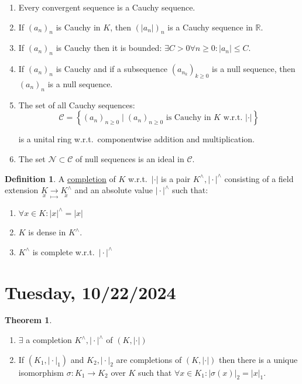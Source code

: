 \documentclass[openany]{amsbook}
\numberwithin{section}{chapter}
\theoremstyle{definition}
\newtheorem*{definition}{Definition}
\newtheorem{theorem}{Theorem}[chapter]
\begin{document}
\begin{enumerate}[label=\roman*)]
    \item Every convergent sequence is a Cauchy sequence.
    \item If \((a_n)_n\) is Cauchy in \(K\), then \((\vert a_n \vert)_n\) is a Cauchy sequence in \(\mathbb{R}\).
    \item If \((a_n)_n\) is Cauchy then it is bounded: \(\exists C > 0 \forall n \geq 0: \vert a_n \vert \leq C\).
    \item If \((a_n)_n\) is Cauchy and if a subsequence \((a_{n_k})_{k\geq 0}\) is a null sequence, then \((a_n)_n\) is a null sequence.
    \item The set of all Cauchy sequences:
    \[
        \mathcal{C} = \left\{ (a_n)_{n\geq 0} \mid (a_n)_{n\geq 0} \text{ is Cauchy in \(K\) w.r.t.\ \(\vert \cdot \vert\)}  \right\} 
    \]

    is a unital ring w.r.t.\ componentwise addition and multiplication.

    \item The set \(\mathcal{N} \subset \mathcal{C}\) of null sequences is an ideal in \(\mathcal{C}\).
\end{enumerate} 

\begin{definition}
    A \underline{completion} of \(K\) w.r.t.\ \(\vert \cdot \vert \) is a pair \(K^\wedge, \vert \cdot \vert ^ \wedge\) consisting of a field extension \(\underset{x}{K} \underset{\mapsto}{\to}  \underset{x}{K^\wedge} \) and an absolute value \(\vert \cdot \vert ^\wedge\) such that:
    
    \begin{enumerate}[label=\roman*)]
        \item \(\forall x\in K: \vert x \vert ^\wedge = \vert x \vert \)  
        \item \(K\) is dense in \(K^\wedge\).
        \item \(K^\wedge\) is complete w.r.t.\ \(\vert \cdot \vert ^\wedge\) 
    \end{enumerate} 
\end{definition}

\section*{Tuesday, 10/22/2024}

\begin{theorem}
    \begin{enumerate}[label=\roman*)]
        \item \(\exists\) a completion \(K^\wedge, \vert \cdot \vert ^\wedge\) of \((K, \vert \cdot \vert)\)
        \item If \((K_1, \vert \cdot \vert _1)\) and \(K_2, \vert \cdot \vert_2\) are completions of \((K,\vert \cdot \vert )\) then there is a unique isomorphism \(\sigma : K_1 \to K_2\) over \(K\) such that \(\forall x\in K_1 : \vert \sigma (x) \vert _2 = \vert x \vert _1\).  
    \end{enumerate} 
\end{theorem}
\end{document}

